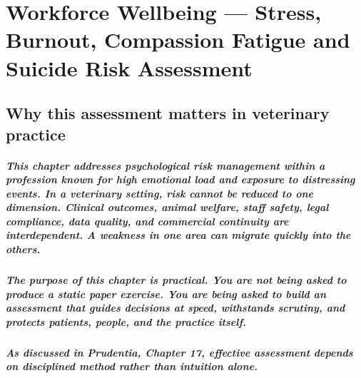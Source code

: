\chapter{Workforce Wellbeing — Stress, Burnout, Compassion Fatigue and Suicide Risk Assessment}
\label{chap:Workforce Wellbeing — Stress, Burnout, Compassion Fatigue and Suicide Risk Assessment}

\section{Why this assessment matters in veterinary practice}

\paragraph{This chapter addresses psychological risk management within a profession known for high emotional load and exposure to distressing events. In a veterinary setting, risk cannot be reduced to one dimension. Clinical outcomes, animal welfare, staff safety, legal compliance, data quality, and commercial continuity are interdependent. A weakness in one area can migrate quickly into the others.}

\paragraph{The purpose of this chapter is practical. You are not being asked to produce a static paper exercise. You are being asked to build an assessment that guides decisions at speed, withstands scrutiny, and protects patients, people, and the practice itself.}

\paragraph{As discussed in Prudentia, Chapter 17, effective assessment depends on disciplined method rather than intuition alone.}



